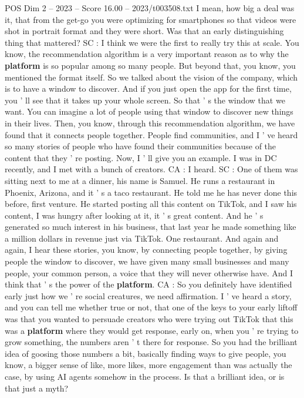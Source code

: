 \begin{textsample}{POS Dim 2 – 2023 – Score 16.00 – 2023/t003508.txt}
I mean, how big a deal was it, that from the get-go you were optimizing for smartphones so that videos were shot in portrait format and they were short.
Was that an early distinguishing thing that mattered?
SC : I think we were the first to really try this at scale.
You know, the recommendation algorithm is a very important reason as to why the \textbf{platform} is so popular among so many people.
But beyond that, you know, you mentioned the format itself.
So we talked about the vision of the company, which is to have a window to discover.
And if you just open the app for the first time, you ' ll see that it takes up your whole screen.
So that ' s the window that we want.
You can imagine a lot of people using that window to discover new things in their lives.
Then, you know, through this recommendation algorithm, we have found that it connects people together.
People find communities, and I ' ve heard so many stories of people who have found their communities because of the content that they ' re posting.
Now, I ' ll give you an example.
I was in DC recently, and I met with a bunch of creators.
CA : I heard.
SC : One of them was sitting next to me at a dinner, his name is Samuel.
He runs a restaurant in Phoenix, Arizona, and it ' s a taco restaurant.
He told me he has never done this before, first venture.
He started posting all this content on TikTok, and I saw his content, I was hungry after looking at it, it ' s great content.
And he ' s generated so much interest in his business, that last year he made something like a million dollars in revenue just via TikTok.
One restaurant.
And again and again, I hear these stories, you know, by connecting people together, by giving people the window to discover, we have given many small businesses and many people, your common person, a voice that they will never otherwise have.
And I think that ' s the power of the \textbf{platform}.
CA : So you definitely have identified early just how we ' re social creatures, we need affirmation.
I ' ve heard a story, and you can tell me whether true or not, that one of the keys to your early liftoff was that you wanted to persuade creators who were trying out TikTok that this was a \textbf{platform} where they would get response, early on, when you ' re trying to grow something, the numbers aren ' t there for response.
So you had the brilliant idea of goosing those numbers a bit, basically finding ways to give people, you know, a bigger sense of like, more likes, more engagement than was actually the case, by using AI agents somehow in the process.
Is that a brilliant idea, or is that just a myth?

\end{textsample}
